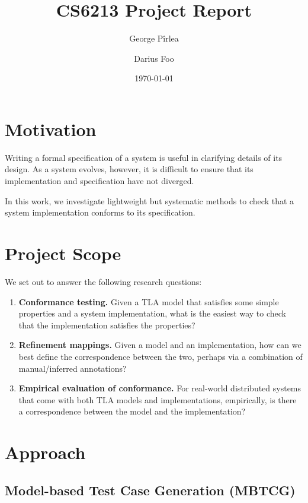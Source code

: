 \documentclass[a4paper]{article}
\title{CS6213 Project Report}
\author{George Pîrlea \and Darius Foo}
\date{\today}
\begin{document}
\maketitle

\section{Motivation}

Writing a formal specification of a system is useful in clarifying details of its design. As a system evolves, however, it is difficult to ensure that its implementation and specification have not diverged.

In this work, we investigate lightweight but systematic methods to check that a system implementation conforms to its specification.

\section{Project Scope}

We set out to answer the following research questions:

\begin{enumerate}[label={(Q\arabic*)}]
    \item \textbf{Conformance testing.} Given a TLA model that satisfies some simple properties and a system implementation, what is the easiest way to check that the implementation satisfies the properties?

    \item \textbf{Refinement mappings.} Given a model and an implementation, how can we best define the correspondence between the two, perhaps via a combination of manual/inferred annotations?

    \item \textbf{Empirical evaluation of conformance.} For real-world distributed systems that come with both TLA models and implementations, empirically, is there a correspondence between the model and the implementation?
\end{enumerate}

\section{Approach}

\subsection{Model-based Test Case Generation (MBTCG)}
\end{document}
